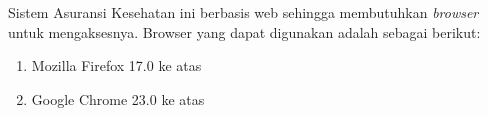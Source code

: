 Sistem Asuransi Kesehatan ini berbasis web sehingga membutuhkan \textit{browser} untuk mengaksesnya. Browser yang dapat digunakan adalah sebagai berikut:
\begin{enumerate}
	\item Mozilla Firefox 17.0 ke atas
	\item Google Chrome 23.0 ke atas
\end{enumerate}